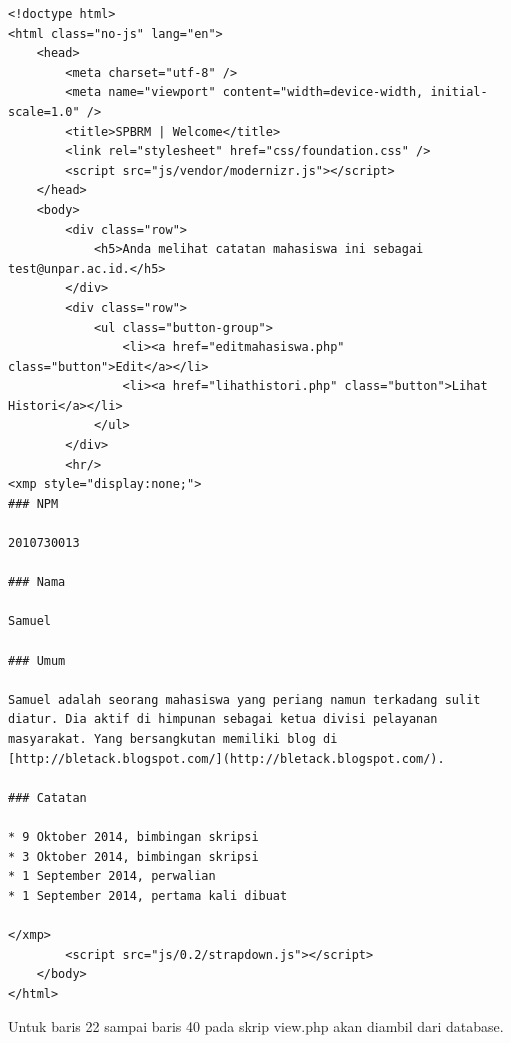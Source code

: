 \begin{lstlisting}[basicstyle=\footnotesize]
<!doctype html>
<html class="no-js" lang="en">
	<head>
		<meta charset="utf-8" />
		<meta name="viewport" content="width=device-width, initial-scale=1.0" />
		<title>SPBRM | Welcome</title>
		<link rel="stylesheet" href="css/foundation.css" />
		<script src="js/vendor/modernizr.js"></script>
	</head>
	<body>
		<div class="row">
			<h5>Anda melihat catatan mahasiswa ini sebagai test@unpar.ac.id.</h5>
		</div>
		<div class="row">
			<ul class="button-group">
				<li><a href="editmahasiswa.php" class="button">Edit</a></li>
				<li><a href="lihathistori.php" class="button">Lihat Histori</a></li>
			</ul>
		</div>
		<hr/>
<xmp style="display:none;">
### NPM

2010730013

### Nama

Samuel
			
### Umum
			
Samuel adalah seorang mahasiswa yang periang namun terkadang sulit diatur. Dia aktif di himpunan sebagai ketua divisi pelayanan masyarakat. Yang bersangkutan memiliki blog di [http://bletack.blogspot.com/](http://bletack.blogspot.com/).
			
### Catatan
			
* 9 Oktober 2014, bimbingan skripsi
* 3 Oktober 2014, bimbingan skripsi
* 1 September 2014, perwalian
* 1 September 2014, pertama kali dibuat

</xmp>
		<script src="js/0.2/strapdown.js"></script>
	</body>
</html>
\end{lstlisting}
Untuk baris 22 sampai baris 40 pada skrip view.php akan diambil dari database.

